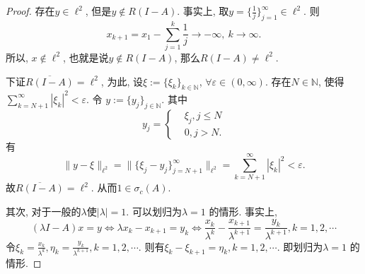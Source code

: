 \documentclass[UTF8,twoside]{ctexbook}
\newcommand{\kx}{\mathbb}
\numberwithin{equation}{section}
\begin{document}
\begin{proof}
		存在$y\in\ell^2$, 但是$y\notin R(I-A)$. 事实上, 取$y=\{\frac{1}{j}\}_{j=1}^\infty\in\ell^2.$ 则
		\[
		x_{k+1}=x_1-\sum_{j=1}^{k}\frac{1}{j}\rightarrow -\infty,\ k\rightarrow\infty.
		\]
		所以, $x\notin\ell^2$, 也就是说$y\notin R(I-A)$, 那么$R(I-A)\neq\ell^2.$

		下证$\overline{R(I-A)}=\ell^2$, 为此, 设$\xi:=\{\xi_k\}_{k\in\kx N}$, $\forall\varepsilon\in(0,\infty)$. 存在$N\in\kx N$, 使得$\sum_{k=N+1}^\infty|\xi_k|^2<\varepsilon$. 令
		$y:=\{y_j\}_{j\in\kx N}$. 其中
		\[
		y_j=\left\{
		\begin{aligned}
		&\xi_j,j\leq  N\\
		&0,j>N.
		\end{aligned}
		\right.
		\]
		有
		\[
		\|y-\xi\|_{\ell^2}=\|\{\xi_j-y_j\}_{j=N+1}^{\infty}\|_{\ell^2}=\sum_{k=N+1}^\infty|\xi_k|^2<\varepsilon.
		\]
		故$\overline{R(I-A)}=\ell^2$. 从而$1\in\sigma_c(A)$.

		其次, 对于一般的$\lambda$使$|\lambda|=1$. 可以划归为$\lambda=1$ 的情形. 事实上,
		\[
		(\lambda I-A)x=y\Longleftrightarrow\lambda x_k-x_{k+1}=y_k\Longleftrightarrow\frac{x_k}{\lambda^k}-\frac{x_{k+1}}{\lambda^{k+1}}=\frac{y_k}{\lambda^{k+1}}, k=1,2,\cdots
		\]
		令$\xi_k=\frac{x_k}{\lambda^k},\eta_k=\frac{y_k}{\lambda^{k+1}},k=1,2,\cdots$. 则有$\xi_k-\xi_{k+1}=\eta_k,k=1,2,\cdots$. 即划归为$\lambda=1$ 的情形.
	\end{proof}
\end{document}
